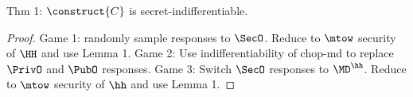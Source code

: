 Thm 1: $\construct{C}$ is secret-indifferentiable.
\begin{proof}
Game 1: randomly sample responses to $\SecO$. Reduce to $\mtow$ security of $\HH$ and use Lemma 1.
Game 2: Use indifferentiability of chop-md to replace $\PrivO$ and $\PubO$ responses.
Game 3: Switch $\SecO$ responses to $\MD^{\hh}$. Reduce to $\mtow$ security of $\hh$ and use Lemma 1.
\end{proof}


